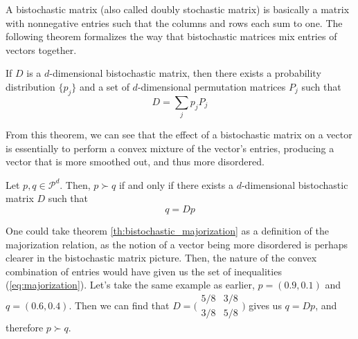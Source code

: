 A bistochastic matrix (also called doubly stochastic matrix) is basically a matrix with nonnegative entries such that the columns and rows each sum to one. The following theorem formalizes the way that bistochastic matrices mix entries of vectors together.

\begin{theorem} \label{th:birkhoff}
    If $D$ is a $d$-dimensional bistochastic matrix, then there exists a probability distribution $\{p_j\}$ and a set of $d$-dimensional permutation matrices $P_j$ such that
    \begin{equation} \label{eq:birkhoff}
        D = \sum_{j} p_j P_j
    \end{equation}
\end{theorem}

From this theorem, we can see that the effect of a bistochastic matrix on a vector is essentially to perform a convex mixture of the vector's entries, producing a vector that is more smoothed out, and thus more disordered.

\begin{theorem} \label{th:bistochastic_majorization}
    Let $p, q \in \mathcal{P}^d$. Then, $p \succ q$ if and only if there exists a $d$-dimensional bistochastic matrix $D$ such that
    \begin{equation} \label{eq:bistochastic_majorization}
        q = Dp
    \end{equation}
\end{theorem}

One could take theorem \ref{th:bistochastic_majorization} as a definition of the majorization relation, as the notion of a vector being more disordered is perhaps clearer in the bistochastic matrix picture. Then, the nature of the convex combination of entries would have given us the set of inequalities (\ref{eq:majorization}). Let's take the same example as earlier, $p = (0.9, 0.1)$ and $q = (0.6, 0.4)$. Then we can find that $D = \big(\begin{smallmatrix}
                                                                                                    5/8 & 3/8 \\
                                                                                                    3/8 & 5/8
                                                                                                \end{smallmatrix}\big)$
gives us $q = Dp$, and therefore $p \succ q$.

